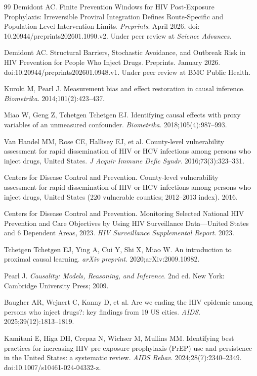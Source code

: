 \documentclass[12pt]{article}
\begin{document}
\begin{thebibliography}{99}
 Demidont AC. Finite Prevention Windows for HIV Post-Exposure Prophylaxis: Irreversible Proviral Integration Defines Route-Specific and Population-Level Intervention Limits. \emph{Preprints}. April 2026. doi: 10.20944/preprints202601.1090.v2. Under peer review at \emph{Science Advances}.

 Demidont AC. Structural Barriers, Stochastic Avoidance, and Outbreak Risk in HIV Prevention for People Who Inject Drugs. {Preprints}. January 2026. doi:10.20944/preprints202601.0948.v1. Under peer review at BMC Public Health.

 Kuroki M, Pearl J. Measurement bias and effect restoration in causal inference. \textit{Biometrika}. 2014;101(2):423--437.

 Miao W, Geng Z, Tchetgen Tchetgen EJ. Identifying causal effects with proxy variables of an unmeasured confounder. \textit{Biometrika}. 2018;105(4):987--993.

 Van Handel MM, Rose CE, Hallisey EJ, et al. County-level vulnerability assessment for rapid dissemination of HIV or HCV infections among persons who inject drugs, United States. \emph{J Acquir Immune Defic Syndr}. 2016;73(3):323--331.

 Centers for Disease Control and Prevention. County-level vulnerability assessment for rapid dissemination of HIV or HCV infections among persons who inject drugs, United States (220 vulnerable counties; 2012--2013 index). 2016.

 Centers for Disease Control and Prevention. Monitoring Selected National HIV Prevention and Care Objectives by Using HIV Surveillance Data---United States and 6 Dependent Areas, 2023. \textit{HIV Surveillance Supplemental Report}. 2023.

 Tchetgen Tchetgen EJ, Ying A, Cui Y, Shi X, Miao W. An introduction to proximal causal learning. \textit{arXiv preprint}. 2020;arXiv:2009.10982.

 Pearl J. \textit{Causality: Models, Reasoning, and Inference}. 2nd ed. New York: Cambridge University Press; 2009.

 Baugher AR, Wejnert C, Kanny D, et al. Are we ending the HIV epidemic among persons who inject drugs?: key findings from 19 US cities. \textit{AIDS}. 2025;39(12):1813--1819.

 Kamitani E, Higa DH, Crepaz N, Wichser M, Mullins MM. Identifying best practices for increasing HIV pre-exposure prophylaxis (PrEP) use and persistence in the United States: a systematic review. \textit{AIDS Behav}. 2024;28(7):2340--2349. doi:10.1007/s10461-024-04332-z.


\end{thebibliography}
\end{document}
